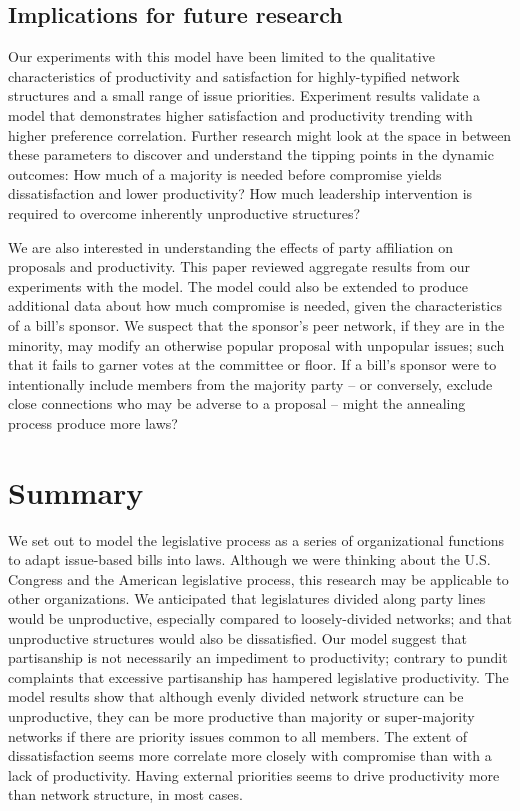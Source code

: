 \documentclass[pdftex,12pt]{llncs}
\begin{document}
\subsection{Implications for future research}
Our experiments with this model have been limited to the qualitative characteristics of productivity and satisfaction for highly-typified network structures and a small range of issue priorities.
Experiment results validate a model that demonstrates higher satisfaction and productivity trending with higher preference correlation. 
Further research might look at the space in between these parameters to discover and understand the tipping points in the dynamic outcomes:
How much of a majority is needed before compromise yields dissatisfaction and lower productivity? 
How much leadership intervention is required to overcome inherently unproductive structures?

We are also interested in understanding the effects of party affiliation on proposals and productivity. This paper reviewed aggregate results from our experiments with the model.
The model could also be extended to produce additional data about how much compromise is needed, given the characteristics of a bill's sponsor.
We suspect that the sponsor's peer network, if they are in the minority, may modify an otherwise popular proposal with unpopular issues; such that it fails to garner votes at the committee or floor. 
If a bill's sponsor were to intentionally include members from the majority party -- or conversely, exclude close connections who may be adverse to a proposal -- might the annealing process produce more laws?

\section{Summary}
We set out to model the legislative process as a series of organizational functions to adapt issue-based bills into laws.
Although we were thinking about the U.S. Congress and the American legislative process, this research may be applicable to other organizations.
We anticipated that legislatures divided along party lines would be unproductive, especially compared to loosely-divided networks; and that unproductive structures would also be dissatisfied.
Our model suggest that partisanship is not necessarily an impediment to productivity; contrary to pundit complaints that excessive partisanship has hampered legislative productivity.
The model results show that although evenly divided network structure can be unproductive, they can be more productive than majority or super-majority networks if there are priority issues common to all members.
The extent of dissatisfaction seems more correlate more closely with compromise than with a lack of productivity. 
Having external priorities seems to drive productivity more than network structure, in most cases. 
\end{document}
